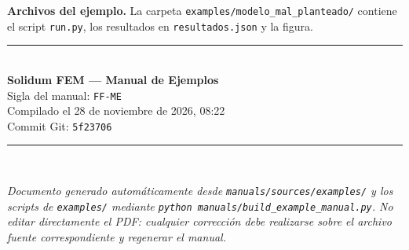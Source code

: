 \documentclass[11pt,oneside]{report}
\begin{document}
\textbf{Archivos del ejemplo.} La carpeta \texttt{examples/\allowbreak{}modelo\_\allowbreak{}mal\_\allowbreak{}planteado/\allowbreak{}} contiene el script \texttt{run.py}, los resultados en \texttt{resultados.json} y la figura.


\newpage

\clearpage
\thispagestyle{empty}
\vspace*{\fill}
\begin{center}
\rule{0.4\textwidth}{0.4pt}\\[1em]
{\bfseries\color{yamlkey} Solidum FEM --- Manual de Ejemplos}\\[0.5em]
Sigla del manual: \texttt{FF-ME}\\[0.5em]
Compilado el 28 de noviembre de 2026, 08:22\\[0.5em]
Commit Git: \texttt{5f23706}\\[1em]
\rule{0.4\textwidth}{0.4pt}\\[2em]
\parbox{0.75\textwidth}{\small\itshape\centering
Documento generado automáticamente desde \texttt{manuals/sources/examples/} y los scripts de \texttt{examples/} mediante \texttt{python manuals/build\_example\_manual.py}. No editar directamente el PDF: cualquier corrección debe realizarse sobre el archivo fuente correspondiente y regenerar el manual.}
\end{center}
\vspace*{\fill}
\end{document}
